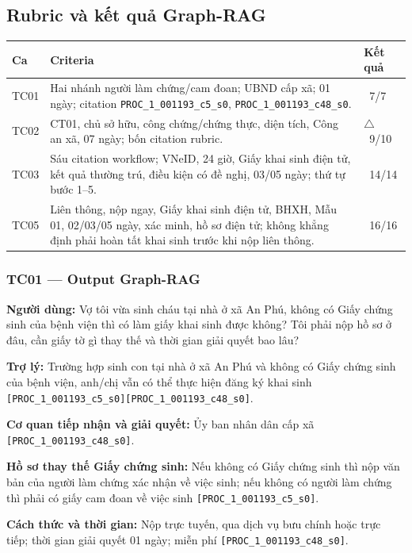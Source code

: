\documentclass[11pt,a4paper]{article}
\newcommand{\yes}{\textcolor{green!50!black}{\checkmark}}
\newcommand{\partok}{\textcolor{orange!80!black}{\ensuremath{\triangle}}}
\newcommand{\src}[1]{\texttt{#1}}
\begin{document}
\subsection{Rubric và kết quả Graph-RAG}
\begin{longtable}{p{1.1cm}p{9.8cm}p{2.2cm}}
\toprule
\textbf{Ca} & \textbf{Criteria} & \textbf{Kết quả}\\
\midrule
\endhead
TC01 & Hai nhánh người làm chứng/cam đoan; UBND cấp xã; 01 ngày; citation \src{PROC\_1\_001193\_c5\_s0}, \src{PROC\_1\_001193\_c48\_s0}. & \yes\ 7/7\\
TC02 & CT01, chủ sở hữu, công chứng/chứng thực, diện tích, Công an xã, 07 ngày; bốn citation rubric. & \partok\ 9/10\\
TC03 & Sáu citation workflow; VNeID, 24 giờ, Giấy khai sinh điện tử, kết quả thường trú, điều kiện có đề nghị, 03/05 ngày; thứ tự bước 1--5. & \yes\ 14/14\\
TC05 & Liên thông, nộp ngay, Giấy khai sinh điện tử, BHXH, Mẫu 01, 02/03/05 ngày, xác minh, hồ sơ điện tử; không khẳng định phải hoàn tất khai sinh trước khi nộp liên thông. & \yes\ 16/16\\
\bottomrule
\end{longtable}

\subsubsection*{TC01 --- Output Graph-RAG}
\begin{questionbox}
\textbf{Người dùng:} Vợ tôi vừa sinh cháu tại nhà ở xã An Phú, không có Giấy chứng sinh của bệnh viện thì có làm giấy khai sinh được không? Tôi phải nộp hồ sơ ở đâu, cần giấy tờ gì thay thế và thời gian giải quyết bao lâu?
\end{questionbox}
\begin{answerbox}
\textbf{Trợ lý:} Trường hợp sinh con tại nhà ở xã An Phú và không có Giấy chứng sinh của bệnh viện, anh/chị vẫn có thể thực hiện đăng ký khai sinh \src{[PROC\_1\_001193\_c5\_s0][PROC\_1\_001193\_c48\_s0]}.

\textbf{Cơ quan tiếp nhận và giải quyết:} Ủy ban nhân dân cấp xã \src{[PROC\_1\_001193\_c48\_s0]}.

\textbf{Hồ sơ thay thế Giấy chứng sinh:} Nếu không có Giấy chứng sinh thì nộp văn bản của người làm chứng xác nhận về việc sinh; nếu không có người làm chứng thì phải có giấy cam đoan về việc sinh \src{[PROC\_1\_001193\_c5\_s0]}.

\textbf{Cách thức và thời gian:} Nộp trực tuyến, qua dịch vụ bưu chính hoặc trực tiếp; thời gian giải quyết 01 ngày; miễn phí \src{[PROC\_1\_001193\_c48\_s0]}.
\end{answerbox}
\end{document}
